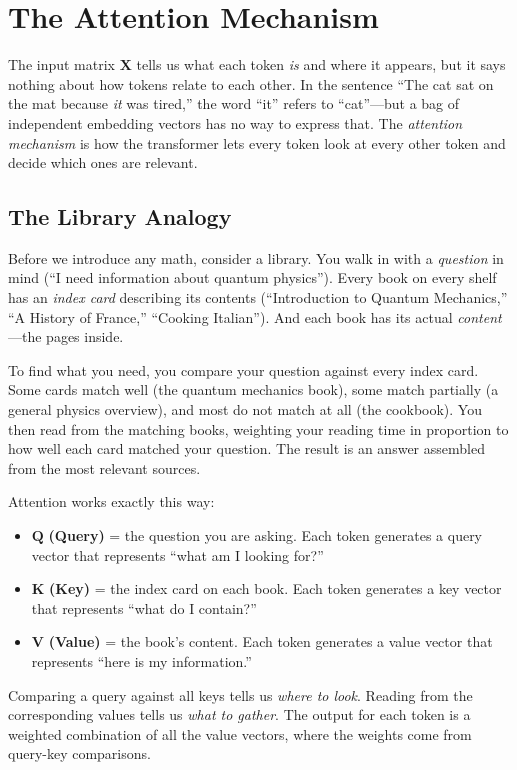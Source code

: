 \section{The Attention Mechanism}
\label{sec:attention-mechanism}

The input matrix $\mathbf{X}$ tells us what each token \emph{is} and where it appears, but it says nothing about how tokens relate to each other. In the sentence ``The cat sat on the mat because \emph{it} was tired,'' the word ``it'' refers to ``cat''---but a bag of independent embedding vectors has no way to express that. The \emph{attention mechanism} is how the transformer lets every token look at every other token and decide which ones are relevant.

\subsection{The Library Analogy}

Before we introduce any math, consider a library. You walk in with a \emph{question} in mind (``I need information about quantum physics''). Every book on every shelf has an \emph{index card} describing its contents (``Introduction to Quantum Mechanics,'' ``A History of France,'' ``Cooking Italian''). And each book has its actual \emph{content}---the pages inside.

To find what you need, you compare your question against every index card. Some cards match well (the quantum mechanics book), some match partially (a general physics overview), and most do not match at all (the cookbook). You then read from the matching books, weighting your reading time in proportion to how well each card matched your question. The result is an answer assembled from the most relevant sources.

Attention works exactly this way:
\begin{itemize}
  \item $\mathbf{Q}$ \textbf{(Query)} = the question you are asking. Each token generates a query vector that represents ``what am I looking for?''
  \item $\mathbf{K}$ \textbf{(Key)} = the index card on each book. Each token generates a key vector that represents ``what do I contain?''
  \item $\mathbf{V}$ \textbf{(Value)} = the book's content. Each token generates a value vector that represents ``here is my information.''
\end{itemize}
Comparing a query against all keys tells us \emph{where to look}. Reading from the corresponding values tells us \emph{what to gather}. The output for each token is a weighted combination of all the value vectors, where the weights come from query-key comparisons.

